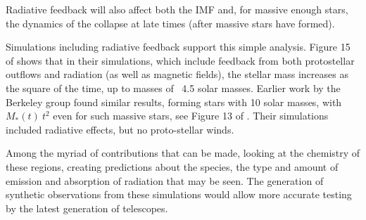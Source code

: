 \documentclass[../dissertation.tex]{subfiles}
\begin{document}

Radiative feedback will also affect both the IMF and, for massive enough stars, the dynamics of the collapse at late times (after massive stars have formed). 

%

Simulations including radiative feedback support this simple analysis. 
Figure 15 of  \citet{2014MNRAS.439.3420M} shows that in their simulations, 
which include feedback from both protostellar outflows and radiation (as well as magnetic fields), 
the stellar mass increases as the square of the time, up to masses of ~4.5 solar masses. 
Earlier work by the Berkeley group found similar results, forming stars with 10 solar masses, 
with $M_*(t)~ t^2$ even for such massive stars, see Figure 13 of \citet{2012ApJ...754...71K}. 
Their simulations included radiative effects, but no proto-stellar winds. 

Among the myriad of contributions that can be made, looking at the chemistry of these regions, 
creating predictions about the species, the type and amount of emission and absorption of radiation that may be seen. 
The generation of synthetic observations from these simulations would allow more accurate testing by the latest generation of telescopes.
\end{document}
